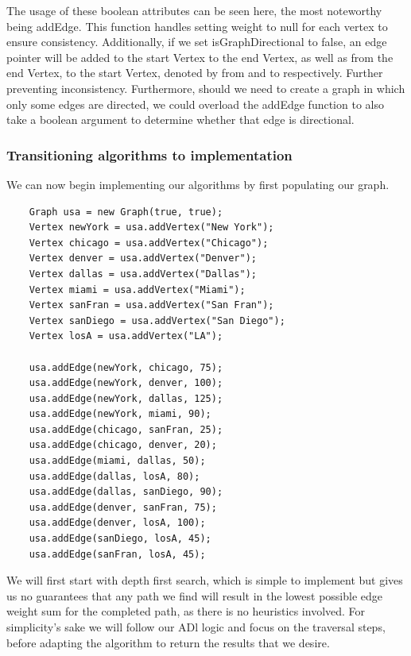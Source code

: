 \documentclass[a4paper]{article}
\begin{document}
The usage of these boolean attributes can be seen here, the most noteworthy being addEdge.
This function handles setting weight to null for each vertex to ensure consistency.
Additionally, if we set isGraphDirectional to false, an edge pointer will be added to the
start Vertex to the end Vertex, as well as from the end Vertex, to the start Vertex, denoted by from and to respectively.
Further preventing inconsistency. Furthermore, should we need to create a graph in which only some edges are directed, 
we could overload the addEdge function to also take a boolean argument to determine whether that edge is directional.

\newpage



  

\subsubsection{Transitioning algorithms to implementation}

We can now begin implementing our algorithms by first populating our graph. \\


\begin{verbatim}
    Graph usa = new Graph(true, true);
    Vertex newYork = usa.addVertex("New York");
    Vertex chicago = usa.addVertex("Chicago");
    Vertex denver = usa.addVertex("Denver");
    Vertex dallas = usa.addVertex("Dallas");
    Vertex miami = usa.addVertex("Miami");
    Vertex sanFran = usa.addVertex("San Fran");
    Vertex sanDiego = usa.addVertex("San Diego");
    Vertex losA = usa.addVertex("LA");

    usa.addEdge(newYork, chicago, 75);
    usa.addEdge(newYork, denver, 100);
    usa.addEdge(newYork, dallas, 125);
    usa.addEdge(newYork, miami, 90);
    usa.addEdge(chicago, sanFran, 25);
    usa.addEdge(chicago, denver, 20);
    usa.addEdge(miami, dallas, 50);
    usa.addEdge(dallas, losA, 80);
    usa.addEdge(dallas, sanDiego, 90);
    usa.addEdge(denver, sanFran, 75);
    usa.addEdge(denver, losA, 100);
    usa.addEdge(sanDiego, losA, 45);
    usa.addEdge(sanFran, losA, 45);
\end{verbatim}




\vspace{12mm}

We will first start with depth first search, which is simple to implement but gives
us no guarantees that any path we find will result in the lowest possible edge weight sum 
for the completed path, as there is no heuristics involved. For simplicity's sake we will follow our ADl logic and focus on the traversal 
steps, before adapting the algorithm to return the results that we desire.
\end{document}
